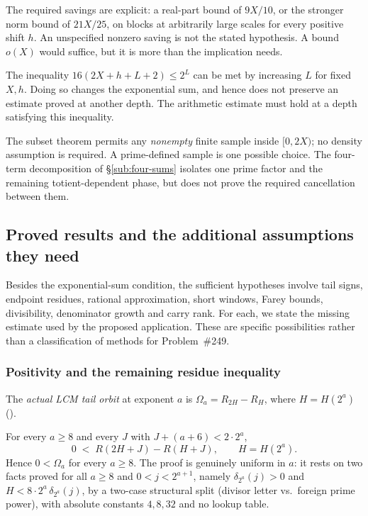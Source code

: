 \begin{rem}
The required savings are explicit: a real-part bound of $9X/10$, or
the stronger norm bound of $21X/25$, on blocks at arbitrarily large
scales for every positive shift $h$. An unspecified nonzero saving is
not the stated hypothesis. A bound $o(X)$ would suffice, but it is more
than the implication needs.

The inequality $16(2X+h+L+2)\le2^L$ can be met by increasing $L$ for
fixed $X,h$. Doing so changes the exponential sum, and hence does not
preserve an estimate proved at another depth. The arithmetic estimate
must hold at a depth satisfying this inequality.

The subset theorem permits any \emph{nonempty} finite sample inside
$[0,2X)$; no density assumption is required. A prime-defined sample is
one possible choice. The four-term decomposition of
\S\ref{sub:four-sums} isolates one prime
factor and the remaining totient-dependent phase, but does not prove
the required cancellation between them.
\end{rem}

\subsection{Proved results and the additional assumptions they need}

Besides the exponential-sum condition, the sufficient hypotheses
involve tail signs, endpoint residues, rational approximation, short
windows, Farey bounds, divisibility, denominator growth and carry rank.
For each, we state the missing estimate used by the proposed
application. These are specific possibilities rather than a
classification of methods for Problem~\#249.

\subsubsection{Positivity and the remaining residue inequality}

\begin{defn}
The \emph{actual LCM tail orbit} at exponent $a$ is
$\Omega_a = R_{2H}-R_H$, where $H = {H}(2^a)$
().
\end{defn}

\begin{thm}\label{thm:positivity-remaining-residue-inequality}
For every $a\ge 8$ and every $J$ with $J+(a{+}6) < 2\cdot 2^a$,
\[
  0 \;<\; {R}(2H{+}J) - {R}(H{+}J), \qquad H={H}(2^a).
\]
Hence $0 < \Omega_a$ for every $a\ge 8$. The proof is genuinely uniform in
$a$: it rests on two facts proved for all $a\ge 8$ and $0<j<2^{a+1}$, namely $\delta_{2^a}(j)>0$ and $H<8\cdot 2^a\,\delta_{2^a}(j)$, by a two-case structural split (divisor letter
vs.\ foreign prime power), with absolute constants $4,8,32$ and no lookup table.
\end{thm}

